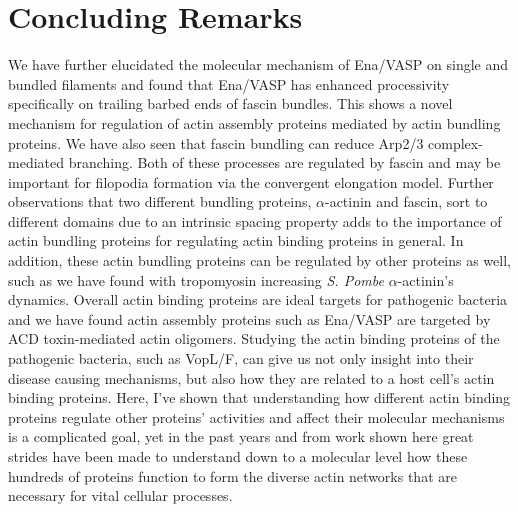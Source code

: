 \section{Concluding Remarks}\label{final-conclusions}
We have further elucidated the molecular mechanism of Ena/VASP on single and bundled filaments and found that Ena/VASP has enhanced processivity specifically on trailing barbed ends of fascin bundles. This shows a novel mechanism for regulation of actin assembly proteins mediated by actin bundling proteins. We have also seen that fascin bundling can reduce Arp2/3 complex-mediated branching. Both of these processes are regulated by fascin and may be important for filopodia formation via the convergent elongation model. Further observations that two different bundling proteins, $\alpha$-actinin and fascin, sort to different domains due to an intrinsic spacing property adds to the importance of actin bundling proteins for regulating actin binding proteins in general. In addition, these actin bundling proteins can be regulated by other proteins as well, such as we have found with tropomyosin increasing \textit{S. Pombe} $\alpha$-actinin's dynamics. Overall actin binding proteins are ideal targets for pathogenic bacteria and we have found actin assembly proteins such as Ena/VASP are targeted by ACD toxin-mediated actin oligomers. Studying the actin binding proteins of the pathogenic bacteria, such as VopL/F, can give us not only insight into their disease causing mechanisms, but also how they are related to a host cell's actin binding proteins. Here, I've shown that understanding how different actin binding proteins regulate other proteins' activities and affect their molecular mechanisms is a complicated goal, yet in the past years and from work shown here great strides have been made to understand down to a molecular level how these hundreds of proteins function to form the diverse actin networks that are necessary for vital cellular processes.


